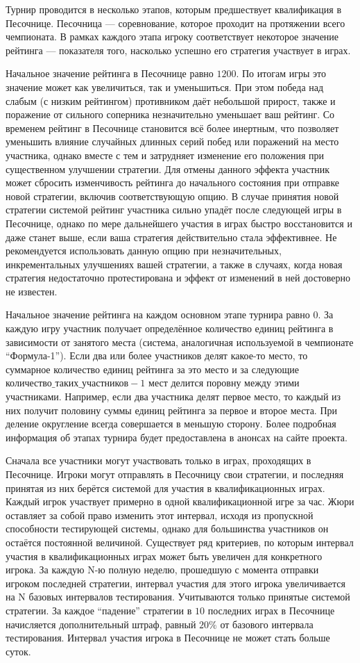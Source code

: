 Турнир проводится в несколько этапов, которым предшествует квалификация в Песочнице.
Песочница --- соревнование, которое проходит на протяжении всего чемпионата.
В рамках каждого этапа игроку соответствует некоторое значение рейтинга ---
показателя того, насколько успешно его стратегия участвует в играх.

Начальное значение рейтинга в Песочнице равно $1200$. По итогам игры это значение может как увеличиться, так и уменьшиться.
При этом победа над слабым (с низким рейтингом) противником даёт небольшой прирост, также и поражение от сильного соперника незначительно уменьшает ваш рейтинг.
Со временем рейтинг в Песочнице становится всё более инертным, что позволяет уменьшить влияние случайных длинных серий побед или поражений на место участника,
однако вместе с тем и затрудняет изменение его положения при существенном улучшении стратегии.
Для отмены данного эффекта участник может сбросить изменчивость рейтинга до начального состояния при отправке новой стратегии, включив соответствующую опцию.
В случае принятия новой стратегии системой рейтинг участника сильно упадёт после следующей игры в Песочнице,
однако по мере дальнейшего участия в играх быстро восстановится и даже станет выше, если ваша стратегия действительно стала эффективнее.
Не рекомендуется использовать данную опцию при незначительных, инкрементальных улучшениях вашей стратегии, а также в случаях,
когда новая стратегия недостаточно протестирована и эффект от изменений в ней достоверно не известен.

Начальное значение рейтинга на каждом основном этапе турнира равно $0$.
За каждую игру участник получает определённое количество единиц рейтинга в зависимости от занятого места
(система, аналогичная используемой в чемпионате ``Формула-1'').
Если два или более участников делят какое-то место, то суммарное количество единиц рейтинга за это место и за следующие
$\texttt{количество\_таких\_участников}-1$ мест делится поровну между этими участниками.
Например, если два участника делят первое место, то каждый из них получит половину суммы единиц рейтинга за первое и второе места.
При деление округление всегда совершается в меньшую сторону.
Более подробная информация об этапах турнира будет предоставлена в анонсах на сайте проекта.

Сначала все участники могут участвовать только в играх, проходящих в Песочнице.
Игроки могут отправлять в Песочницу свои стратегии, и последняя принятая из них берётся системой для участия в квалификационных играх.
Каждый игрок участвует примерно в одной квалификационной игре за час.
Жюри оставляет за собой право изменить этот интервал, исходя из пропускной способности тестирующей системы,
однако для большинства участников он остаётся постоянной величиной.
Существует ряд критериев, по которым интервал участия в квалификационных играх может быть увеличен для конкретного игрока.
За каждую N-ю полную неделю, прошедшую с момента отправки игроком последней стратегии,
интервал участия для этого игрока увеличивается на N базовых интервалов тестирования.
Учитываются только принятые системой стратегии.
За каждое ``падение'' стратегии в $10$ последних играх в Песочнице начисляется дополнительный штраф, равный $20\%$ от базового  интервала тестирования.
Интервал участия игрока в Песочнице не может стать больше суток.

